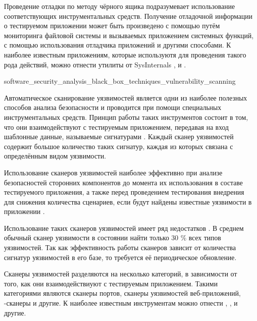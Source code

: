 %
Проведение отладки по методу чёрного ящика подразумевает использование соответствующих инструментальных средств. 
%
Получение отладочной информации о тестируемом приложении может быть произведено с помощью путём мониторинга файловой системы и вызываемых приложением системных функций, с помощью использования отладчика приложений и другими способами. 
%
К наиболее известным приложениям, которые используютя для проведения такого рода действий, можно отнести утилиты от SysInternals ,   и  .


	{software_security_analysis_black_box_techniques_vulnerability_scanning}

%
Автоматическое сканирование уязвимостей является одни из наиболее полезных способов анализа безопасности  и проводится при помощи специальных инструментальных средств. 
%
Принцип работы таких инструментов состоит в том, что они взаимодействуют с тестируемым приложением, передавая на вход шаблонные данные, называемые сигнатурами . 
%
Каждый сканер уязвимостей содержит большое количество таких сигнатур, каждая из которых связана с определённым видом уязвимости.

%
Использование сканеров уязвимостей наиболее эффективно при анализе безопасностей сторонних компонентов до момента их использования в составе тестируемого приложения, а также перед проведением тестирования внедрения для снижения количества сценариев, если будут найдены известные уязвимости в приложении . 

%
Использование таких сканеров уязвимостей имеет ряд недостатков . 
%
В среднем обычный сканер уязвимости в состоянии найти только 30 \% всех типов уязвимостей. 
%
Так как эффективность работы сканеров зависит от количества сигнатур уязвимостей в его базе, то требуется её периодическое обновление.

%
Сканеры уязвимостей разделяются на несколько категорий, в зависимости от того, как они взаимодействиуют с тестируемым приложением. 
%
Такими категориями являются сканеры портов, сканеры уязвимостей веб-приложений, -сканеры и другие. 
%
К наиболее известным инструментам можно отнести  ,  ,   и другие.

